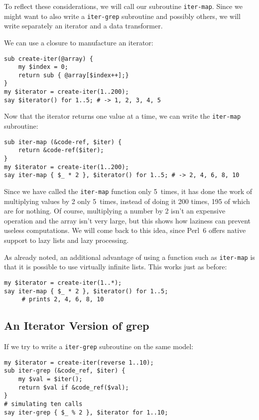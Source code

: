To reflect these considerations, we will call our subroutine 
{\tt iter-map}. Since we might want to also write a 
{\tt iter-grep} subroutine and possibly others, we will 
write separately an iterator and a data transformer.

We can use a closure to manufacture an iterator:

\begin{verbatim}
sub create-iter(@array) {
    my $index = 0;
    return sub { @array[$index++];}
}
my $iterator = create-iter(1..200);
say $iterator() for 1..5; # -> 1, 2, 3, 4, 5
\end{verbatim} 

Now that the iterator returns one value at a time, we 
can write the {\tt iter-map} subroutine:

\begin{verbatim}
sub iter-map (&code-ref, $iter) {
    return &code-ref($iter);
}
my $iterator = create-iter(1..200);
say iter-map { $_ * 2 }, $iterator() for 1..5; # -> 2, 4, 6, 8, 10
\end{verbatim}

Since we have called the {\tt iter-map} function only 5~times, 
it has done the work of multiplying values by 2 only 5~times, 
instead of doing it 200 times, 195 of which are for nothing. 
Of course, multiplying a number by 2 isn't an expensive 
operation and the array isn't very large, but this shows 
how laziness can prevent useless computations. We will come 
back to this idea, since Perl~6 offers native support to lazy 
lists and lazy processing.

As already noted, an additional advantage of using a function 
such as {\tt iter-map} is that it is possible to use 
virtually infinite lists. This works just as before:

\begin{verbatim}
my $iterator = create-iter(1..*);
say iter-map { $_ * 2 }, $iterator() for 1..5;
     # prints 2, 4, 6, 8, 10
\end{verbatim}

\subsection{An Iterator Version of grep}

If we try to write a {\tt iter-grep} subroutine on the same 
model:

\begin{verbatim}
my $iterator = create-iter(reverse 1..10);
sub iter-grep (&code_ref, $iter) {
    my $val = $iter();
    return $val if &code_ref($val);
}
# simulating ten calls
say iter-grep { $_ % 2 }, $iterator for 1..10;
\end{verbatim}

